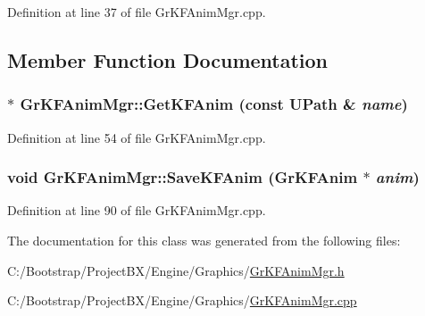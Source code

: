 Definition at line 37 of file GrKFAnimMgr.cpp.

\subsection{Member Function Documentation}
\hypertarget{class_gr_k_f_anim_mgr_bd9ec4d6de5f1bea19523b6352fe1d04}{
\subsubsection[{GetKFAnim}]{ $\ast$ GrKFAnimMgr::GetKFAnim (const {\bf UPath} \& {\em name})}}
\label{class_gr_k_f_anim_mgr_bd9ec4d6de5f1bea19523b6352fe1d04}




Definition at line 54 of file GrKFAnimMgr.cpp.\hypertarget{class_gr_k_f_anim_mgr_8b9ac050905522f03b5732ae8d716f09}{
\subsubsection[{SaveKFAnim}]{\setlength{\rightskip}{0pt plus 5cm}void GrKFAnimMgr::SaveKFAnim ({\bf GrKFAnim} $\ast$ {\em anim})}}
\label{class_gr_k_f_anim_mgr_8b9ac050905522f03b5732ae8d716f09}




Definition at line 90 of file GrKFAnimMgr.cpp.

The documentation for this class was generated from the following files:\begin{CompactItemize}
\item 
C:/Bootstrap/ProjectBX/Engine/Graphics/\hyperlink{_gr_k_f_anim_mgr_8h}{GrKFAnimMgr.h}\item 
C:/Bootstrap/ProjectBX/Engine/Graphics/\hyperlink{_gr_k_f_anim_mgr_8cpp}{GrKFAnimMgr.cpp}\end{CompactItemize}
